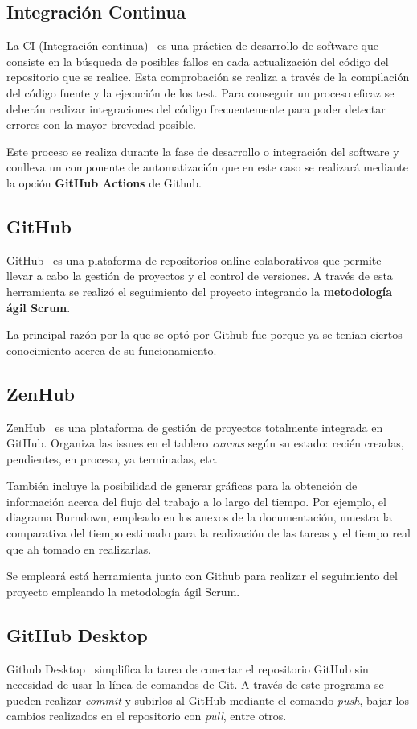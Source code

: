 \subsection{Integración Continua}
La CI (Integración continua)~\cite{pagina_CI} es una práctica de desarrollo de software que consiste en la búsqueda de posibles fallos en cada actualización del código del repositorio que se realice. Esta comprobación se realiza a través de la compilación del código fuente y la ejecución de los test. Para conseguir un proceso eficaz se deberán realizar integraciones del código frecuentemente para poder detectar errores con la mayor brevedad posible.

Este proceso se realiza durante la fase de desarrollo o integración del software y conlleva un componente de automatización que en este caso se realizará mediante la opción \textbf{GitHub Actions} de Github.

\subsection{GitHub}
GitHub~\cite{pagina_github} es una plataforma de repositorios online colaborativos que permite llevar a cabo la gestión de proyectos y el control de versiones. A través de esta herramienta se realizó el seguimiento del proyecto integrando la \textbf{metodología ágil Scrum}.
 
La principal razón por la que se optó por Github fue porque ya se tenían ciertos conocimiento acerca de su funcionamiento. 

\subsection{ZenHub}
ZenHub~\cite{pagina_zenhub} es una plataforma de gestión de proyectos totalmente integrada en GitHub. Organiza las issues en el tablero \emph{canvas} según su estado: recién creadas, pendientes, en proceso, ya terminadas, etc. 

También incluye la posibilidad de generar gráficas para la obtención de información acerca del flujo del trabajo a lo largo del tiempo. Por ejemplo, el diagrama Burndown, empleado en los anexos de la documentación, muestra la comparativa del tiempo estimado para la realización de las tareas y el tiempo real que ah tomado en realizarlas.

Se empleará está herramienta junto con Github para realizar el seguimiento del proyecto empleando la metodología ágil Scrum.

\subsection{GitHub Desktop}
Github Desktop~\cite{pagina_github_desktop} simplifica la tarea de conectar el repositorio GitHub sin necesidad de usar la línea de comandos de Git. A través de este programa se pueden realizar \emph{commit} y subirlos al GitHub mediante el comando \emph{push}, bajar los cambios realizados en el repositorio con \emph{pull}, entre otros.  